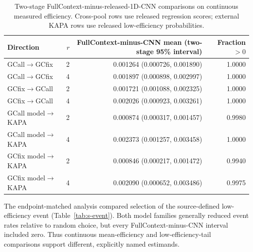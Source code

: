 \documentclass[10pt]{article}
\begin{document}
\begin{table}[H]
\centering
\small
\begin{tabular}{lrrr}
\toprule
Direction & $r$ & FullContext-minus-CNN mean (two-stage 95\% interval) & Fraction $>0$ \\
\midrule
GCall$\rightarrow$GCfix & 2 & 0.001264 (0.000726, 0.001890) & 1.0000 \\
GCall$\rightarrow$GCfix & 4 & 0.001897 (0.000898, 0.002997) & 1.0000 \\
GCfix$\rightarrow$GCall & 2 & 0.001721 (0.001088, 0.002325) & 1.0000 \\
GCfix$\rightarrow$GCall & 4 & 0.002026 (0.000923, 0.003261) & 1.0000 \\
GCall model$\rightarrow$KAPA & 2 & 0.000874 (0.000317, 0.001457) & 0.9980 \\
GCall model$\rightarrow$KAPA & 4 & 0.002373 (0.001257, 0.003458) & 1.0000 \\
GCfix model$\rightarrow$KAPA & 2 & 0.000846 (0.000217, 0.001472) & 0.9940 \\
GCfix model$\rightarrow$KAPA & 4 & 0.002090 (0.000652, 0.003486) & 0.9975 \\
\bottomrule
\end{tabular}
\caption{Two-stage FullContext-minus-released-1D-CNN comparisons on continuous measured efficiency. Cross-pool rows use released regression scores; external KAPA rows use released low-efficiency probabilities.}
\label{tab:s-cnn-two-stage}
\end{table}

The endpoint-matched analysis compared selection of the source-defined low-efficiency event (Table~\ref{tab:s-event}). Both model families generally reduced event rates relative to random choice, but every FullContext-minus-CNN interval included zero. Thus continuous mean-efficiency and low-efficiency-tail comparisons support different, explicitly named estimands.
\end{document}
